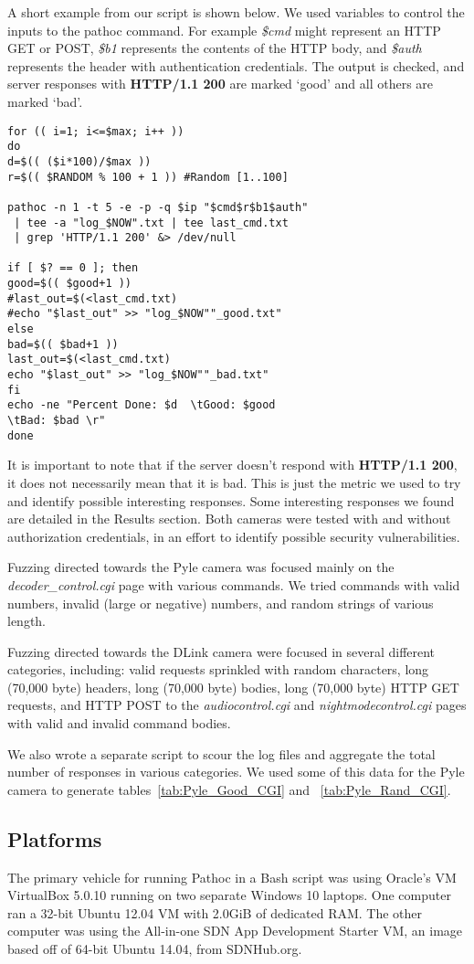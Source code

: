 \documentclass[letterpaper,twocolumn,10pt]{article}
\begin{document}
A short example from our script is shown below. We used variables to control the inputs to the pathoc command. For example \textit{\$cmd} might represent an HTTP GET or POST, \textit{\$b1} represents the contents of the HTTP body, and \textit{\$auth} represents the header with authentication credentials. The output is checked, and server responses with \textbf{HTTP/1.1 200} are marked `good' and all others are marked `bad'. 
\begin{verbatim}
for (( i=1; i<=$max; i++ ))
do	
d=$(( ($i*100)/$max ))
r=$(( $RANDOM % 100 + 1 )) #Random [1..100]

pathoc -n 1 -t 5 -e -p -q $ip "$cmd$r$b1$auth"
 | tee -a "log_$NOW".txt | tee last_cmd.txt
 | grep 'HTTP/1.1 200' &> /dev/null

if [ $? == 0 ]; then
good=$(( $good+1 ))
#last_out=$(<last_cmd.txt)
#echo "$last_out" >> "log_$NOW""_good.txt"
else
bad=$(( $bad+1 ))
last_out=$(<last_cmd.txt)
echo "$last_out" >> "log_$NOW""_bad.txt"
fi		
echo -ne "Percent Done: $d  \tGood: $good   
\tBad: $bad \r"
done
\end{verbatim}

It is important to note that if the server doesn't respond with \textbf{HTTP/1.1 200}, it does not necessarily mean that it is bad. This is just the metric we used to try and identify possible interesting responses. Some interesting responses we found are detailed in the Results section. Both cameras were tested with and without authorization credentials, in an effort to identify possible security vulnerabilities. 

Fuzzing directed towards the Pyle camera was focused mainly on the \textit{decoder\_control.cgi} page with various commands. We tried commands with valid numbers, invalid (large or negative) numbers, and random strings of various length. 

Fuzzing directed towards the DLink camera were focused in several different categories, including: valid requests sprinkled with random characters, long (70,000 byte) headers, long (70,000 byte) bodies, long (70,000 byte) HTTP GET requests, and HTTP POST to the \textit{audiocontrol.cgi} and \textit{nightmodecontrol.cgi} pages with valid and invalid command bodies. 

We also wrote a separate script to scour the log files and aggregate the total number of responses in various categories. We used some of this data for the Pyle camera to generate tables~\ref{tab:Pyle_Good_CGI} and ~\ref{tab:Pyle_Rand_CGI}. 


\subsection{Platforms}
The primary vehicle for running Pathoc in a Bash script was using Oracle's VM VirtualBox 5.0.10 running on two separate Windows 10 laptops. One computer ran a 32-bit Ubuntu 12.04 VM with 2.0GiB of dedicated RAM. The other computer was using the All-in-one SDN App Development Starter VM, an image based off of 64-bit Ubuntu 14.04, from SDNHub.org.
\end{document}
